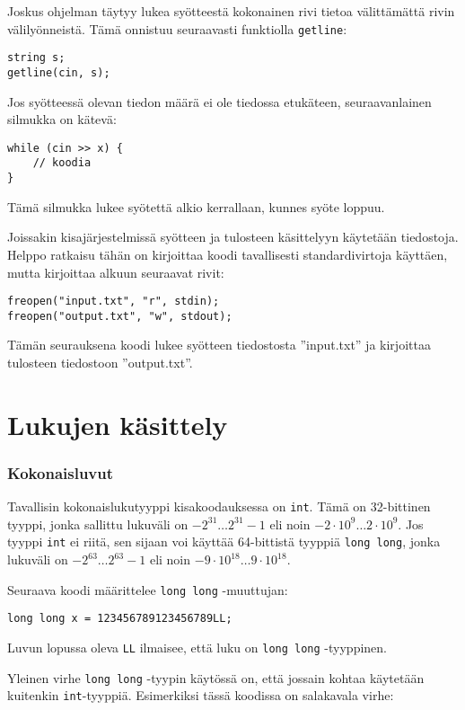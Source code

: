 Joskus ohjelman täytyy lukea syötteestä
kokonainen rivi tietoa
välittämättä rivin välilyönneistä.
Tämä onnistuu seuraavasti funktiolla
\texttt{getline}:

\begin{lstlisting}
string s;
getline(cin, s);
\end{lstlisting}

Jos syötteessä olevan tiedon määrä ei ole tiedossa
etukäteen, seuraavanlainen silmukka on kätevä:
\begin{lstlisting}
while (cin >> x) {
    // koodia
}
\end{lstlisting}
Tämä silmukka lukee syötettä alkio
kerrallaan, kunnes syöte loppuu.

Joissakin kisajärjestelmissä syötteen ja tulosteen
käsittelyyn käytetään tiedostoja. Helppo ratkaisu tähän
on kirjoittaa koodi tavallisesti
standardivirtoja käyttäen,
mutta kirjoittaa alkuun seuraavat rivit:
\begin{lstlisting}
freopen("input.txt", "r", stdin);
freopen("output.txt", "w", stdout);
\end{lstlisting}
Tämän seurauksena koodi lukee syötteen tiedostosta
''input.txt'' ja kirjoittaa tulosteen
tiedostoon ''output.txt''.

\section{Lukujen käsittely}


\subsubsection{Kokonaisluvut}

Tavallisin kokonaislukutyyppi kisakoodauksessa on \texttt{int}.
Tämä on 32-bittinen tyyppi,
jonka sallittu lukuväli on $-2^{31} \ldots 2^{31}-1$
eli noin $-2 \cdot 10^9 \ldots 2 \cdot 10^9$.
Jos tyyppi \texttt{int} ei riitä, sen sijaan voi käyttää
64-bittistä tyyppiä
\texttt{long long}, jonka lukuväli on $-2^{63} \ldots 2^{63}-1$
eli noin $-9 \cdot 10^{18} \ldots 9 \cdot 10^{18}$.

Seuraava koodi määrittelee
\texttt{long long} -muuttujan:
\begin{lstlisting}
long long x = 123456789123456789LL;
\end{lstlisting}
Luvun lopussa oleva \texttt{LL}
ilmaisee, että luku on \texttt{long long} -tyyppinen.

Yleinen virhe \texttt{long long} -tyypin käytössä on,
että jossain kohtaa käytetään kuitenkin \texttt{int}-tyyppiä.
Esimerkiksi tässä koodissa on salakavala virhe:

